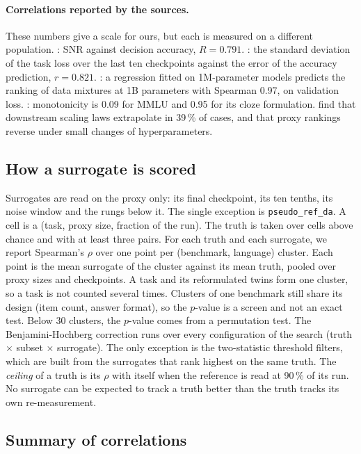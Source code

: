 \paragraph{Correlations reported by the sources.}
These numbers give a scale for ours, but each is measured on a different population.
\citet{heineman_signal_2025}: SNR against decision accuracy, $R = 0.791$.
\citet{bhagia_establishing_2025}: the standard deviation of the task loss over the last ten checkpoints against the error of the accuracy prediction, $r = 0.821$.
\citet{liu_regmix_2025}: a regression fitted on 1M-parameter models predicts the ranking of data mixtures at 1B parameters with Spearman 0.97, on validation loss.
\citet{madaan_quantifying_2024}: monotonicity is 0.09 for MMLU and 0.95 for its cloze formulation.
\citet{lourie_scaling_2025} find that downstream scaling laws extrapolate in 39\,\% of cases, and \citet{wang_can_2026} that proxy rankings reverse under small changes of hyperparameters.

\subsection{How a surrogate is scored}
\label{app:sur-scoring}

Surrogates are read on the proxy only: its final checkpoint, its ten tenths, its noise window and the rungs below it.
The single exception is \texttt{pseudo\_ref\_da}.
A cell is a (task, proxy size, fraction of the run). The truth is taken over cells above chance and with at least three pairs.
For each truth and each surrogate, we report Spearman's $\rho$ over one point per (benchmark, language) cluster. Each point is the mean surrogate of the cluster against its mean truth, pooled over proxy sizes and checkpoints.
A task and its reformulated twins form one cluster, so a task is not counted several times. Clusters of one benchmark still share its design (item count, answer format), so the $p$-value is a screen and not an exact test. Below 30 clusters, the $p$-value comes from a permutation test.
The Benjamini-Hochberg correction runs over every configuration of the search (truth $\times$ subset $\times$ surrogate). The only exception is the two-statistic threshold filters, which are built from the surrogates that rank highest on the same truth.
The \emph{ceiling} of a truth is its $\rho$ with itself when the reference is read at 90\,\% of its run. No surrogate can be expected to track a truth better than the truth tracks its own re-measurement.

\subsection{Summary of correlations}
\label{app:sur-results}

